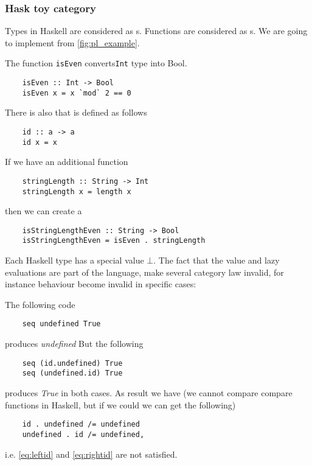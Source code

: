 \subsubsection{\textbf{Hask} toy category}
\begin{example}
  \label{ex:haskcategory}
  Types in Haskell are considered as s.
  Functions are considered as s.
  We are going to implement  from
  \cref{fig:pl_example}.

  The function \texttt{isEven}
  converts\texttt{Int} type 
  into Bool.
  \begin{verbatim}
    isEven :: Int -> Bool
    isEven x = x `mod` 2 == 0
  \end{verbatim}

  There is also  that is defined as follows
  \begin{verbatim}
    id :: a -> a
    id x = x
  \end{verbatim}

  If we have an additional function
  \begin{verbatim}
    stringLength :: String -> Int
    stringLength x = length x
  \end{verbatim}
  then we can create a 
  \begin{verbatim}
    isStringLengthEven :: String -> Bool
    isStringLengthEven = isEven . stringLength
  \end{verbatim}

\end{example}

\begin{remark}
  \label{rem:hask_lazy_eval}
  Each Haskell type has a special value $\bot$. The fact that the
  value and lazy evaluations are part of the language, make several
  category law invalid, for instance 
   behaviour become invalid in specific cases:

  The following code
  \begin{verbatim}
    seq undefined True
  \end{verbatim}
  produces \textit{undefined}
  But the following
  \begin{verbatim}
    seq (id.undefined) True
    seq (undefined.id) True
  \end{verbatim}
  produces \textit{True} in both cases.
  As result we have
  (we cannot compare compare functions in Haskell, but if we
  could we can get the following)
  \begin{verbatim}
    id . undefined /= undefined
    undefined . id /= undefined,
  \end{verbatim}
  i.e. \eqref{eq:leftid} and
  \eqref{eq:rightid} are not satisfied.  
\end{remark}


